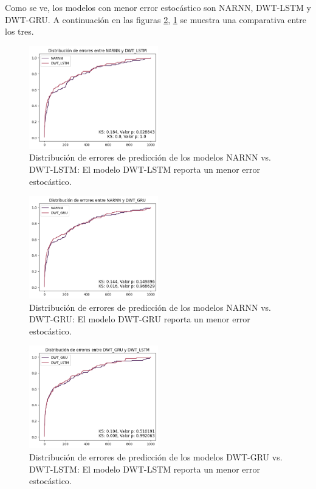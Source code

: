 Como se ve, los modelos con menor error estocástico son NARNN, DWT-LSTM y DWT-GRU. A continuación en las figuras \ref{fig:NARNN_DWTGRU}, \ref{fig:NARNN_DWTLSTM} se muestra una comparativa entre los tres.

\begin{figure}[H]
    \centering
    \includegraphics[width=0.5\textwidth]{Figuras/analisis/kolmogorov/NARNN_DWTLSTM.png}
    \caption{Distribución de errores de predicción de los modelos NARNN vs. DWT-LSTM: El modelo DWT-LSTM reporta un menor error estocástico.} 
    \label{fig:NARNN_DWTLSTM}
\end{figure}

\begin{figure}[H]
    \centering
    \includegraphics[width=0.5\textwidth]{Figuras/analisis/kolmogorov/NARNN_DWTGRU.png}
    \caption{Distribución de errores de predicción de los modelos NARNN vs. DWT-GRU: El modelo DWT-GRU reporta un menor error estocástico.} 
    \label{fig:NARNN_DWTGRU}
\end{figure}

\begin{figure}[H]
    \centering
    \includegraphics[width=0.5\textwidth]{Figuras/analisis/kolmogorov/DWTGRU_DWTLSTM.png}
    \caption{Distribución de errores de predicción de los modelos DWT-GRU vs. DWT-LSTM: El modelo DWT-LSTM reporta un menor error estocástico.} 
    \label{fig:DWTGRU_DWTLSTM}
\end{figure}

